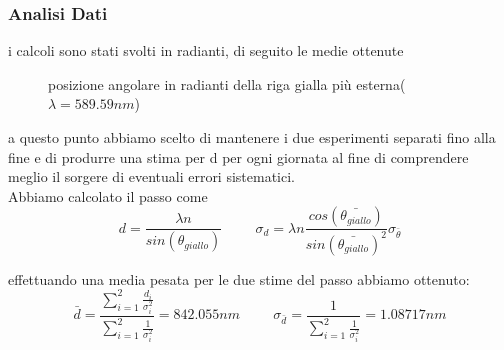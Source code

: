 \documentclass[a4paper]{article}
\theoremstyle{definition}
\begin{document}
\subsubsection{Analisi Dati}
i calcoli sono stati svolti in radianti, di seguito le medie ottenute\\
	\begin{figure}[!htbp]
	\captionsetup{labelformat=empty}
        \caption{posizione angolare in radianti della riga gialla più esterna($\lambda=589.59nm$)}

    \end{figure}
    
a questo punto abbiamo scelto di mantenere i due esperimenti separati fino alla fine e di produrre una stima per d per ogni giornata al fine di comprendere meglio il sorgere di eventuali errori sistematici.\\

\noindent Abbiamo calcolato il passo come 
\[d = \frac{\lambda n}{sin(\theta_{giallo})} \hspace{1cm} \sigma_{d} = \lambda n \frac{cos(\bar{\theta_{giallo}} )} {sin(\bar{\theta_{giallo}})^{2} }\sigma_{\bar{\theta}} \]

\begin{figure}[!htbp]
	\captionsetup{labelformat=empty}
    \end{figure}
effettuando una media pesata per le due stime del passo abbiamo ottenuto:
\[\bar{d} = \frac{\sum_{i=1}^{2} \frac{d_{i}}{\sigma_{i}^{2}}}{\sum_{i=1}^{2} \frac{1}{\sigma_{i}^{2}}} = 842.055nm \hspace{1cm} \sigma_{\bar{d}} = \frac{1}{\sum_{i=1}^{2} \frac{1}{\sigma_{i}^{2}}} = 1.08717nm\]
\end{document}
